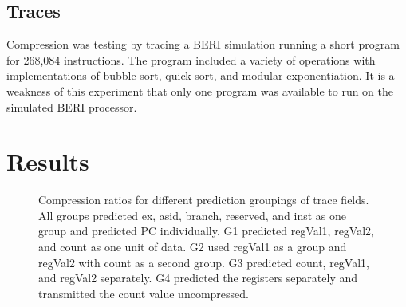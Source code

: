 \documentclass[conference]{IEEEtran}
\begin{document}
\subsection{Traces} %
Compression was testing by tracing a BERI simulation running a short program for 268,084 instructions. The program included a variety of operations with implementations of bubble sort, quick sort, and modular exponentiation. It is a weakness of this experiment that only one program was available to run on the simulated BERI processor.

\section{Results}

\begin{figure}
\label{group_chart}
\caption{Compression ratios for different prediction groupings of trace fields. All groups predicted ex, asid, branch, reserved, and inst as one group and predicted PC individually. G1 predicted regVal1, regVal2, and count as one unit of data. G2 used regVal1 as a group and regVal2 with count as a second group. G3 predicted count, regVal1, and regVal2 separately. G4 predicted the registers separately and transmitted the count value uncompressed.}
\end{figure}
\end{document}
